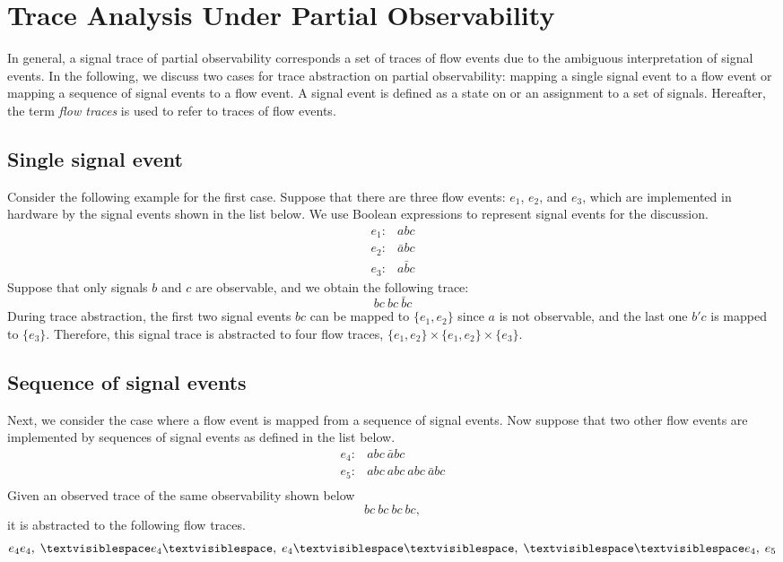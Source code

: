 \documentclass[12pt,frontmatter,copyright,thesis]{usfmanus}
\begin{document}
\chapter{Trace Analysis Under Partial Observability}
In general, a signal trace of partial observability
corresponds a set of traces of flow events due to the
ambiguous interpretation of signal events.  In the
following, we discuss two cases for trace abstraction on
partial observability: mapping a single signal event to a
flow event or mapping a sequence of signal events to a flow
event.  A signal event is defined as a state on or an
assignment to a set of signals.
Hereafter, the term {\em flow traces} is used to refer to
traces of flow events.  
\section{Single signal event}
Consider the following example for
the first case.  Suppose that there are three flow events:
$e_1$, $e_2$, and $e_3$, which are implemented in hardware
by the signal events shown in the list below.  We use
Boolean expressions to represent signal events for the
discussion.
\[
\begin{array}{cl}
e_1: & abc\\
e_2: & \bar{a}bc\\
e_3: & a\bar{b}c
\end{array}
\] 
Suppose that only signals $b$ and $c$ are observable, and we
obtain the following trace:
\[
bc\ bc \ \bar{b}c
\]
During trace abstraction, the first two signal events $bc$
can be mapped to $\{e_1, e_2\}$ since $a$ is not observable,
and the last one $b'c$ is mapped to $\{e_3\}$.  Therefore,
this signal trace is abstracted to four flow traces, $\{e_1,
e_2\} \times \{e_1, e_2\} \times \{e_3\}$.
\section{Sequence of signal events}
Next, we consider the case where a flow event is mapped from
a sequence of signal events.  Now suppose that two other
flow events are implemented by sequences of signal events as
defined in the list below.
\[
\begin{array}{cl}
e_4: & abc\ \bar{a}bc\\
e_5: & abc\ abc\ abc\ \bar{a}bc\\
\end{array}
\] 
Given an observed trace of the same observability shown below
\[
bc\ bc\ bc \ bc,
\]
it is abstracted to the following flow traces.
\[
e_4e_4,\; \textvisiblespace e_4 \textvisiblespace,\;  e_4 \textvisiblespace \textvisiblespace,\;  \textvisiblespace \textvisiblespace e_4, \; e_5
\] 
\end{document}
